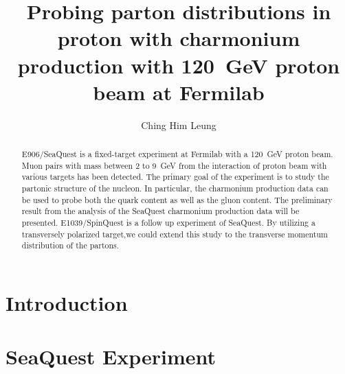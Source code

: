 \documentclass{uiucthesis2021}
\begin{document}
\title{Probing parton distributions in proton with charmonium production with
	\SI{120}{\GeV} proton beam at Fermilab }
\author{Ching Him Leung}

\phdthesis
{}
\maketitle

\frontmatter

\begin{abstract}
E906/SeaQuest is a fixed-target experiment at Fermilab with a \SI{120}{\GeV} 
proton beam. Muon pairs with mass between \num{2} to \SI{9}{\GeV} from the 
interaction of proton beam with various targets has been detected. The primary 
goal of the experiment is to study the partonic structure of the nucleon. In 
particular, the charmonium production data can be used to probe both the quark 
content as well as the gluon content. The preliminary result from the analysis 
of the SeaQuest charmonium production data will be presented.  E1039/SpinQuest 
is a follow up experiment of SeaQuest. By utilizing a transversely polarized 
target,we could extend this study to the transverse momentum distribution of 
the partons. 
\end{abstract}


%

{
	\hypersetup{linkcolor=black}  %
	\tableofcontents
	\listoffigures
}


\mainmatter

\chapter{Introduction}
\label{ch:intro}


\chapter{SeaQuest Experiment}
\label{ch:seaquest}

\end{document}
